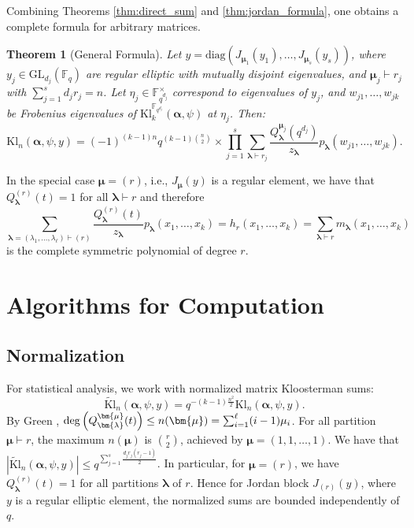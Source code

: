 \documentclass[11pt]{article}
\newtheorem{theorem}{Theorem}[section]
\newcommand{\Fq}{\mathbb{F}_q}
\newcommand{\GL}{\mathrm{GL}}
\newcommand{\Kl}{\mathrm{Kl}}
\newcommand{\tKl}{\widetilde{\mathrm{Kl}}}
\newcommand{\diag}{\mathrm{diag}}
\begin{document}
Combining Theorems \ref{thm:direct_sum} and \ref{thm:jordan_formula}, one obtains a complete formula for arbitrary matrices.
\medskip

\begin{theorem}[General Formula] \cite{zelingher2023matrix}
\label{thm:general_formula}
Let $y = \diag(J_{\bm{\mu}_1}(y_1), \ldots, J_{\bm{\mu}_s}(y_s))$, where $y_j \in \GL_{d_j}(\Fq)$ are regular elliptic with mutually disjoint eigenvalues, and $\bm{\mu}_j \vdash r_j$ with $\sum_{j=1}^s d_j r_j = n$. Let $\eta_j \in \mathbb{F}_{q^{d_j}}^\times$ correspond to eigenvalues of $y_j$, and $w_{j1}, \ldots, w_{jk}$ be Frobenius eigenvalues of $\Kl_k^{\mathbb{F}_{q^{d_j}}}(\bm{\alpha},\psi)$ at $\eta_j$. Then:
$$
\Kl_n(\bm{\alpha}, \psi, y) = (-1)^{(k-1)n} q^{(k-1)\binom{n}{2}} \times
\prod_{j=1}^s \sum_{\bm{\lambda} \vdash r_j} \frac{Q_{\bm{\lambda}}^{\bm{\mu}_j}(q^{d_j})}{z_{\bm{\lambda}}} p_{\bm{\lambda}}(w_{j1}, \ldots, w_{jk}).
$$
\end{theorem}

In the special case $\bm{\mu} = (r)$, i.e., $J_{\bm{\mu}}(y)$ is a regular element, we have that $Q^{(r)}_{\bm{\lambda}}(t)=1$ for all $\bm{\lambda}\vdash r$ and therefore 
\[
\sum_{\bm{\lambda} = (\lambda_1, \ldots, \lambda_{\ell}) \vdash (r)}\frac{Q_{\bm{\lambda}}^{(r)}(t)}{z_{\bm{\lambda}}}p_{\bm{\lambda}}(x_1, \ldots, x_k)= h_r(x_1, \dots, x_k)=\sum_{\bm{\lambda} \vdash r} m_{\bm{\lambda}}(x_1, \dots, x_k)
\]
is the complete symmetric polynomial of degree $r$.

\section{Algorithms for Computation}
\label{sec:algorithms}

\subsection{Normalization}

For statistical analysis, we work with normalized matrix Kloosterman sums:
\[
\tKl_n(\bm{\alpha}, \psi, y) = q^{-(k-1)\frac{n^2}{2}} \Kl_n(\bm{\alpha}, \psi, y).
\]
By Green \cite{green1955characters}, ${\rm deg}\left(Q_{\bm{\lambda}}^{\bm{\mu}}(t)\right)\leq n(\bm{\mu})=\sum_{i=1}^{\ell}(i-1)\mu_i$. For all partition $\bm{\mu}\vdash r$, the maximum $n(\bm{\mu})$ is $\binom{r}{2}$, achieved by $\bm{\mu}=(1, 1, \ldots, 1)$. We have that $|\tKl_n(\bm{\alpha}, \psi, y)| \leq q^{\sum_{j=1}^s\frac{d_jr_j(r_j-1)}{2}}$. In particular, for $\bm{\mu}=(r)$, we have $Q_{\bm{\lambda}}^{(r)}(t) = 1$ for all partitions $\bm{\lambda}$ of $r$. Hence for Jordan block $J_{(r)}(y)$, where $y$ is a regular elliptic element, the normalized sums are bounded independently of $q$.
\end{document}
